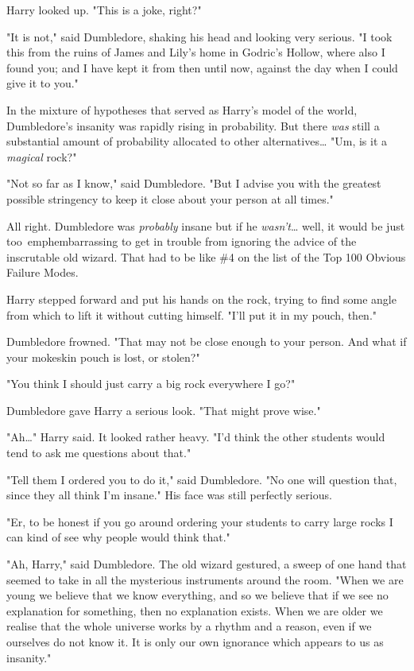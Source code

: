 Harry looked up. "This is a joke, right?"

"It is not," said Dumbledore, shaking his head and looking very serious. "I 
took this from the ruins of James and Lily's home in Godric's Hollow, where 
also I found you; and I have kept it from then until now, against the day when 
I could give it to you."

In the mixture of hypotheses that served as Harry's model of the world, 
Dumbledore's insanity was rapidly rising in probability. But there \emph{was} 
still a substantial amount of probability allocated to other 
alternatives{\ldots} "Um, is it a \emph{magical} rock?"

"Not so far as I know," said Dumbledore. "But I advise you with the greatest 
possible stringency to keep it close about your person at all times."

All right. Dumbledore was \emph{probably} insane but if he 
\emph{wasn't}{\ldots} well, it would be just too\ emph{embarrassing} to get in 
trouble from ignoring the advice of the inscrutable old wizard. That had to be 
like \#4 on the list of the Top 100 Obvious Failure Modes.

Harry stepped forward and put his hands on the rock, trying to find some angle 
from which to lift it without cutting himself. "I'll put it in my pouch, then."

Dumbledore frowned. "That may not be close enough to your person. And what if 
your mokeskin pouch is lost, or stolen?"

"You think I should just carry a big rock everywhere I go?"

Dumbledore gave Harry a serious look. "That might prove wise."

"Ah{\ldots}" Harry said. It looked rather heavy. "I'd think the other students 
would tend to ask me questions about that."

"Tell them I ordered you to do it," said Dumbledore. "No one will question 
that, since they all think I'm insane." His face was still perfectly serious.

"Er, to be honest if you go around ordering your students to carry large rocks 
I can kind of see why people would think that."

"Ah, Harry," said Dumbledore. The old wizard gestured, a sweep of one hand that 
seemed to take in all the mysterious instruments around the room. "When we are 
young we believe that we know everything, and so we believe that if we see no 
explanation for something, then no explanation exists. When we are older we 
realise that the whole universe works by a rhythm and a reason, even if we 
ourselves do not know it. It is only our own ignorance which appears to us as 
insanity."

